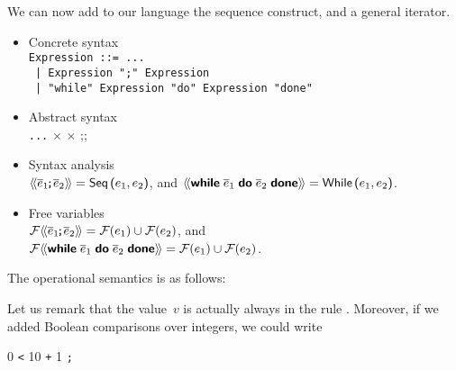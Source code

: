 We can now add to our language the sequence construct, and a general
iterator. 
\begin{itemize}

  \item Concrete syntax\\
\texttt{Expression ::= ...}\\
\texttt{\hphantom{Expression} | Expression ";" Expression}\\
\texttt{\hphantom{Expression} | "while" Expression "do" Expression "done"}

  \item Abstract syntax\\
     \Xtype {} \equal \texttt{...} \vbar{} 
     \Xof {} \(\times\)  
     \vbar{}  \Xof {} \(\times\)
     \textsf{;;}{}

  \item Syntax analysis\\ $\langle\!\langle{\overline{e}_1\!\texttt{;} \overline{e}_2}\rangle\!\rangle =
    \textsf{Seq} \, \textsf{(} e_1, e_2\textsf{)}$, and $\src{\Xwhile \; \meta{e}_1
      \; \Xdo \; \meta{e}_2 \; \Xdone} = \cst{While} \, \lpar e_1,
    e_2\rpar$.

  \item Free variables\\
    $\mathcal{F} \langle\!\langle{\overline{e}_1\!\texttt{;} \overline{e}_2}\rangle\!\rangle
    = \mathcal{F}(e_1) \cup \mathcal{F}(e_2)$, and\\
    $\mathcal{F} \src{\Xwhile \; \meta{e}_1 \; \Xdo \; \meta{e}_2 \; \Xdone}
    = \mathcal{F}(e_1) \cup \mathcal{F}(e_2)$.

\end{itemize}
The operational semantics is as follows:
Let us remark that the value~\(v\) is actually always \lpar\rpar{} in
the rule . Moreover, if we added Boolean comparisons
over integers, we could write
\begin{center}
\Xlet {} \equal \num{0} \Xin
\lpar\Xwhile {} \texttt{<} \num{10} \Xdo {} \assign {}
\texttt{+} \num{1} \Xdone \texttt{;} \rpar
\end{center}


